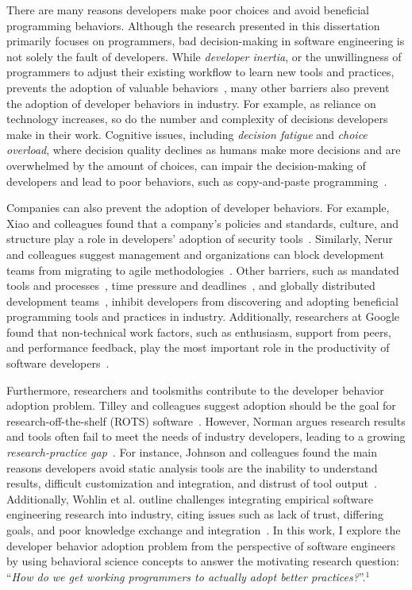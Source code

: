 There are many reasons developers make poor choices and avoid beneficial programming behaviors. Although the research presented in this dissertation primarily focuses on programmers, bad decision-making in software engineering is not solely the fault of developers. While \textit{developer inertia}, or the unwillingness of programmers to adjust their existing workflow to learn new tools and practices, prevents the adoption of valuable behaviors~\cite{Murphy-Hill2011PeerInteraction}, many other barriers also prevent the adoption of developer behaviors in industry. For example, as reliance on technology increases, so do the number and complexity of decisions developers make in their work. Cognitive issues, including \textit{decision fatigue} and \textit{choice overload}, where decision quality declines as humans make more decisions and are overwhelmed by the amount of choices, can impair the decision-making of developers and lead to poor behaviors, such as copy-and-paste programming~\cite{DecisionFatigue}.

Companies can also prevent the adoption of developer behaviors. For example, Xiao and colleagues found that a company's policies and standards, culture, and structure play a role in developers' adoption of security tools~\cite{Xiao2014Security}. Similarly, Nerur and colleagues suggest management and organizations can block development teams from migrating to agile methodologies~\cite{nerur2005agile}. Other barriers, such as mandated tools and processes~\cite{Murphy-Hill2015HowDoUsers}, time pressure and deadlines~\cite{CostelloDeadline84}, and globally distributed development teams~\cite{ebert2008managing}, inhibit developers from discovering and adopting beneficial programming tools and practices in industry. Additionally, researchers at Google found that non-technical work factors, such as enthusiasm, support from peers, and performance feedback, play the most important role in the productivity of software developers~\cite{Murphy-Hill2019Productivity}.

Furthermore, researchers and toolsmiths contribute to the developer behavior adoption problem. Tilley and colleagues suggest adoption should be the goal for research-off-the-shelf (ROTS) software~\cite{Tilley2003ROTS}. However, Norman argues research results and tools often fail to meet the needs of industry developers, leading to a growing \textit{research-practice gap}~\cite{norman2010research}. For instance, Johnson and colleagues found the main reasons developers avoid static analysis tools are the inability to understand results, difficult customization and integration, and distrust of tool output~\cite{Johnson2013Why}. Additionally, Wohlin et al. outline challenges integrating empirical software engineering research into industry, citing issues such as lack of trust, differing goals, and poor knowledge exchange and integration~\cite{wohlin2013empirical}. In this work, I explore the developer behavior adoption problem from the perspective of software engineers by using behavioral science concepts to answer the motivating research question: ``\textit{How do we get working programmers to actually adopt better practices?}''.$^1$

